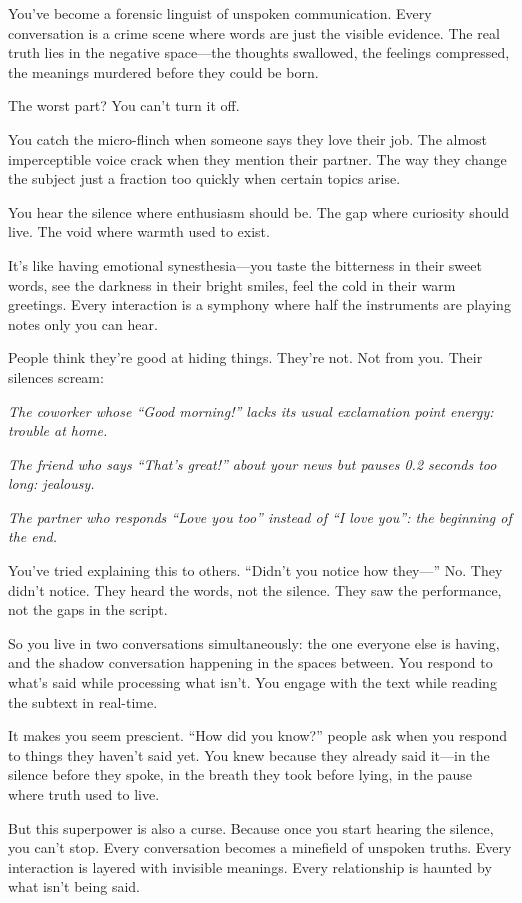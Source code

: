 \documentclass[12pt,letterpaper]{book}
\begin{document}
You've become a forensic linguist of unspoken communication. Every conversation is a crime scene where words are just the visible evidence. The real truth lies in the negative space—the thoughts swallowed, the feelings compressed, the meanings murdered before they could be born.

The worst part? You can't turn it off.

You catch the micro-flinch when someone says they love their job. The almost imperceptible voice crack when they mention their partner. The way they change the subject just a fraction too quickly when certain topics arise.

You hear the silence where enthusiasm should be. The gap where curiosity should live. The void where warmth used to exist.

It's like having emotional synesthesia—you taste the bitterness in their sweet words, see the darkness in their bright smiles, feel the cold in their warm greetings. Every interaction is a symphony where half the instruments are playing notes only you can hear.

People think they're good at hiding things. They're not. Not from you. Their silences scream:

\textit{The coworker whose ``Good morning!'' lacks its usual exclamation point energy: trouble at home.}

\textit{The friend who says ``That's great!'' about your news but pauses 0.2 seconds too long: jealousy.}

\textit{The partner who responds ``Love you too'' instead of ``I love you'': the beginning of the end.}

You've tried explaining this to others. ``Didn't you notice how they—'' No. They didn't notice. They heard the words, not the silence. They saw the performance, not the gaps in the script.

So you live in two conversations simultaneously: the one everyone else is having, and the shadow conversation happening in the spaces between. You respond to what's said while processing what isn't. You engage with the text while reading the subtext in real-time.

It makes you seem prescient. ``How did you know?'' people ask when you respond to things they haven't said yet. You knew because they already said it—in the silence before they spoke, in the breath they took before lying, in the pause where truth used to live.

But this superpower is also a curse. Because once you start hearing the silence, you can't stop. Every conversation becomes a minefield of unspoken truths. Every interaction is layered with invisible meanings. Every relationship is haunted by what isn't being said.
\end{document}
